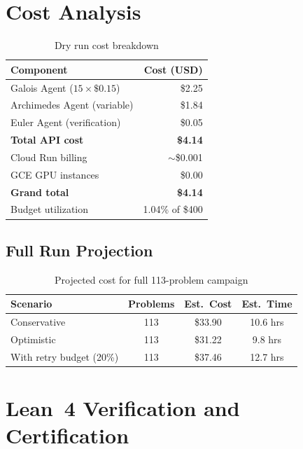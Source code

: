 \documentclass[12pt,a4paper]{report}
\theoremstyle{plain}
\theoremstyle{definition}
\theoremstyle{remark}
\begin{document}
\chapter{Cost Analysis}
\label{ch:cost}

\begin{table}[h!]
\centering
\begin{tabular}{lr}
\toprule
\textbf{Component} & \textbf{Cost (USD)} \\
\midrule
Galois Agent ($15 \times \$0.15$) & \$2.25 \\
Archimedes Agent (variable) & \$1.84 \\
Euler Agent (verification) & \$0.05 \\
\midrule
\textbf{Total API cost} & \textbf{\$4.14} \\
Cloud Run billing & $\sim$\$0.001 \\
GCE GPU instances & \$0.00 \\
\midrule
\textbf{Grand total} & \textbf{\$4.14} \\
Budget utilization & 1.04\% of \$400 \\
\bottomrule
\end{tabular}
\caption{Dry run cost breakdown}
\end{table}

\section{Full Run Projection}

\begin{table}[h!]
\centering
\begin{tabular}{lccc}
\toprule
\textbf{Scenario} & \textbf{Problems} & \textbf{Est.\ Cost} & \textbf{Est.\ Time} \\
\midrule
Conservative & 113 & \$33.90 & 10.6 hrs \\
Optimistic & 113 & \$31.22 & 9.8 hrs \\
With retry budget (20\%) & 113 & \$37.46 & 12.7 hrs \\
\bottomrule
\end{tabular}
\caption{Projected cost for full 113-problem campaign}
\end{table}

\chapter{Lean~4 Verification and Certification}
\label{ch:lean}
\end{document}
